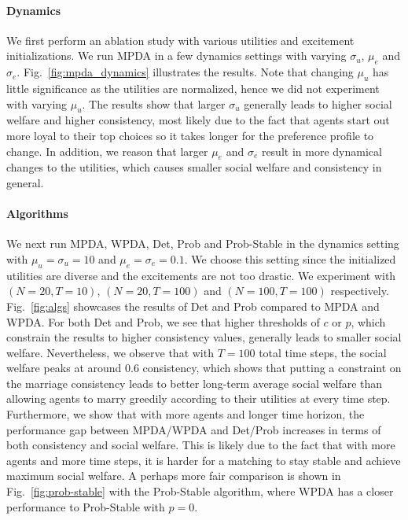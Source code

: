 \paragraph{Dynamics} We first perform an ablation study with various utilities and excitement initializations. We run MPDA in a few dynamics settings with varying $\sigma_u$, $\mu_e$ and $\sigma_e$. Fig.~\ref{fig:mpda_dynamics} illustrates the results. Note that changing $\mu_u$ has little significance as the utilities are normalized, hence we did not experiment with varying $\mu_u$. The results show that larger $\sigma_u$ generally leads to higher social welfare and higher consistency, most likely due to the fact that agents start out more loyal to their top choices so it takes longer for the preference profile to change. In addition, we reason that larger $\mu_e$ and $\sigma_e$ result in more dynamical changes to the utilities, which causes smaller social welfare and consistency in general.



\paragraph{Algorithms} We next run MPDA, WPDA, Det, Prob and Prob-Stable in the dynamics setting with $\mu_u = \sigma_u = 10$ and $\mu_e = \sigma_e = 0.1$. We choose this setting since the initialized utilities are diverse and the excitements are not too drastic. We experiment with $(N=20, T=10)$, $(N=20, T=100)$ and $(N=100, T=100)$ respectively. Fig.~\ref{fig:algs} showcases the results of Det and Prob compared to MPDA and WPDA. For both Det and Prob, we see that higher thresholds of $c$ or $p$, which constrain the results to higher consistency values, generally leads to smaller social welfare. Nevertheless, we observe that with $T=100$ total time steps, the social welfare peaks at around 0.6 consistency, which shows that putting a constraint on the marriage consistency leads to better long-term average social welfare than allowing agents to marry greedily according to their utilities at every time step. Furthermore, we show that with more agents and longer time horizon, the performance gap between MPDA/WPDA and Det/Prob increases in terms of both consistency and social welfare. This is likely due to the fact that with more agents and more time steps, it is harder for a matching to stay stable and achieve maximum social welfare. A perhaps more fair comparison is shown in Fig.~\ref{fig:prob-stable} with the Prob-Stable algorithm, where WPDA has a closer performance to Prob-Stable with $p=0$.

